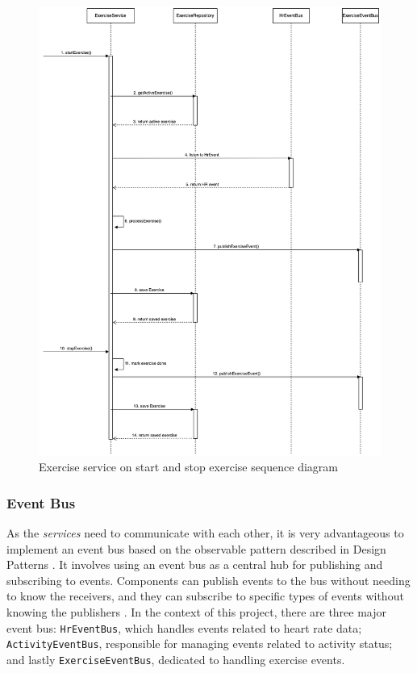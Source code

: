 \begin{figure}[H]
    \centering
    \includegraphics[width=1\textwidth]{diagrams/exercise-service-start.drawio.png}
    \caption{Exercise service on start and stop exercise sequence diagram}
    \label{fig:start_exercise_diagram}
\end{figure}

\subsubsection{Event Bus}
As the \emph{services} need to communicate with each other, it is very advantageous to implement an event bus based on the observable pattern described in Design Patterns \autocite{gamma1995design}. 
It involves using an event bus as a central hub for publishing and subscribing to events. Components can publish events to the bus without needing to know the receivers, and they can subscribe to specific types of events without knowing the publishers \autocite{turan2017}.
In the context of this project, there are three major event bus: \texttt{HrEventBus}, which handles events related to heart rate data; \texttt{ActivityEventBus}, responsible for managing events related to activity status; and lastly \texttt{ExerciseEventBus}, dedicated to handling exercise events.

